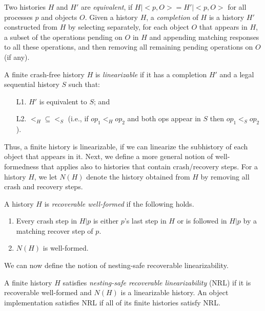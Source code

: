 Two histories $H$ and $H'$ are \emph{equivalent},
if $H|{<}p,O{>}=H'|{<}p,O{>}$ for all processes $p$ and objects $O$.
Given a history $H$, a \textit{completion} of $H$ is a history $H'$
constructed from $H$ by selecting separately,
for each object $O$ that appears in $H$,
a subset of the operations pending on $O$ in $H$ and appending matching
responses to all these operations, and then
removing all remaining pending operations on $O$ (if any).

\begin{definition} 
	\label{Definition: Linearizability}
A finite crash-free history $H$ is \emph{linearizable} if it has a completion $H'$ and a legal sequential history $S$ such that:
	\begin{enumerate}
		\item [L1.] $H'$ is equivalent to $S$; and
		\item [L2.] $<_H \subseteq <_S$ (i.e., if $op_1 <_H op_2$ and both ops appear in $S$ then $op_1 <_S op_2$).
	\end{enumerate}
\end{definition}

Thus, a finite history is linearizable, if we can linearize the subhistory of each object that appears in it.
Next, we define a more general notion of well-formedness that applies also to histories that contain crash/recovery steps. For a history $H$, we let $N(H)$ denote the history obtained from $H$ by removing all crash and recovery steps.

\begin{definition} 
\label{def:recoverable-well-formedness}
A history $H$ is \textit{recoverable well-formed} if the following holds.
\begin{enumerate}
\item Every crash step in $H | p$ is either $p$'s last step in $H$ or is followed in $H | p$ by a matching recover step of $p$.
\item $N(H)$ is well-formed.
\end{enumerate}
\end{definition}

We can now define the notion of nesting-safe recoverable linearizability.

\begin{definition} 
\label{Definition:NRL}
A finite history $H$ satisfies \emph{nesting-safe recoverable linearizability} (NRL) if it is recoverable well-formed and $N(H)$ is a linearizable history.
An object implementation satisfies NRL if all of its finite histories satisfy NRL.
\end{definition}



